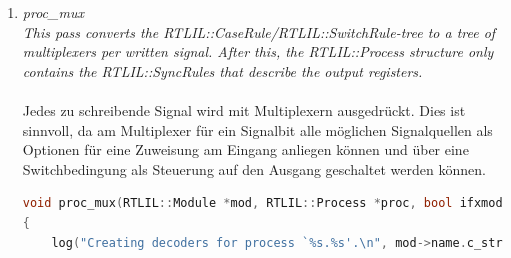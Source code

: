 \documentclass[11pt]{report}
\begin{document}
\begin{enumerate}
\begin{lstlisting}[language=C++]
for (auto mod : design->modules())
			if (design->selected(mod)) {
				SigMap assign_map(mod);
				for (auto &proc_it : mod->processes) {
					if (!design->selected(mod, proc_it.second))
						continue;
					proc_arst(mod, proc_it.second, assign_map);
\end{lstlisting}
Es wird durch alle Module des Designs iteriert. Für jedes Modul wird eine \textit{SigMap assign\_map()} erstellt.
Zu SigMap im Manual:
\begin{lstlisting}[language=C++]
/*
When a design has many wires in it that are connected to each other, then a
single signal bit can have multiple valid names. The SigMap object can be used
to map SigSpecs or SigBits to unique SigSpecs and SigBits that consistently
only use one wire from such a group of connected wires. For example:
*/
SigBit a = module->addWire(NEW_ID);
SigBit b = module->addWire(NEW_ID);
module->connect(a, b);
log("%d\n", a == b); // will print 0 155
SigMap sigmap(module);
log("%d\n", sigmap(a) == sigmap(b)); // will print 1
\end{lstlisting}
Anschließend wird durch die Prozesse der Module iteriert und die Funktion \textit{proc\_arst()} auf das jeweils aktuelle Modul, das \textit{second} Objekt des Paars \textit{proc\_it} (Prozess) und auf die Zuweisungen in der \textit{assign\_map} angewendet.

\item \textit{proc\_mux\\
This pass converts the RTLIL::CaseRule/RTLIL::SwitchRule-tree to a tree of multiplexers per written signal. After this, the RTLIL::Process structure only contains the RTLIL::SyncRules that describe the output registers.
}
\\
\\
Jedes zu schreibende Signal wird mit Multiplexern ausgedrückt. Dies ist sinnvoll, da am Multiplexer für ein Signalbit alle möglichen Signalquellen als Optionen für eine Zuweisung am Eingang anliegen können und über eine Switchbedingung als Steuerung auf den Ausgang geschaltet werden können.\\
\begin{lstlisting}[language=C++]
void proc_mux(RTLIL::Module *mod, RTLIL::Process *proc, bool ifxmode)
{
	log("Creating decoders for process `%s.%s'.\n", mod->name.c_str(), proc->name.c_str());


\end{lstlisting}
\end{enumerate}
\end{document}

